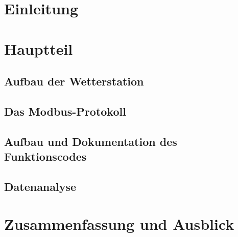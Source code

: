\documentclass[11pt,a4paper,oneside,ngerman,appendixprefix=true,listof=chapterentry]{report}
\begin{document}




\tableofcontents
\listoffigures
\listoftables
\part{Einleitung}

\part{Hauptteil}
\chapter{Aufbau der Wetterstation}

\chapter{Das Modbus-Protokoll}

\chapter{Aufbau und Dokumentation des Funktionscodes}

\chapter{Datenanalyse}
\part{Zusammenfassung und Ausblick}

 
 
\end{document}
